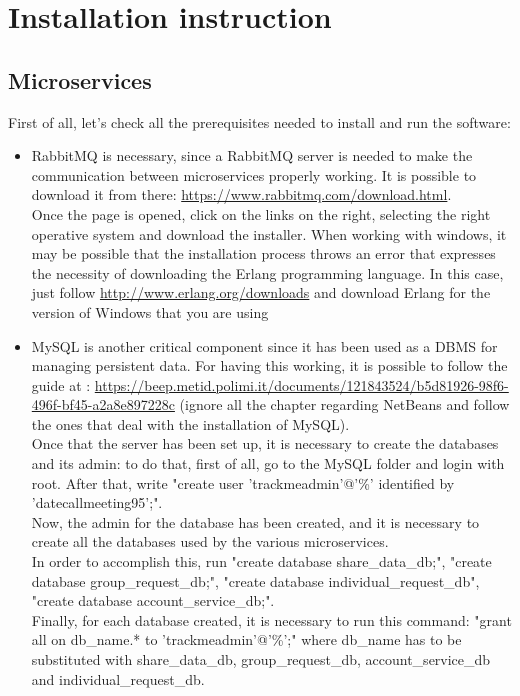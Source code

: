 \section{Installation instruction}
\subsection{Microservices}
First of all, let's check all the prerequisites needed to install and run the software:

\begin{itemize}

\item RabbitMQ is necessary, since a RabbitMQ server is needed to make the communication between microservices properly working.
It is possible to download it from there: \url{https://www.rabbitmq.com/download.html}. \\
Once the page is opened, click on the links on the right, selecting the right operative system and download the installer. 
When working with windows, it may be possible that the installation process throws an error that expresses the necessity of downloading
the Erlang programming language. In this case, just follow \url{http://www.erlang.org/downloads} and download Erlang for the version
of Windows that you are using

\item MySQL is another critical component since it has been used as a DBMS for managing persistent data. For having this working, it
is possible to follow the guide at : \url{https://beep.metid.polimi.it/documents/121843524/b5d81926-98f6-496f-bf45-a2a8e897228c} 
(ignore all the chapter regarding NetBeans and follow the ones that deal with the installation of MySQL). \\
Once that the server has been set up, it is necessary to create the databases and its admin: to do that, first of all, go to the MySQL 
folder and login with root. After that, write "create user 'trackmeadmin'@'\%' identified by 'datecallmeeting95';". \\
Now, the admin for the database has been created, and it is necessary to create all the databases used by the various microservices. \\
In order to accomplish this, run "create database share\_data\_db;", "create database group\_request\_db;", 
"create database individual\_request\_db", "create database account\_service\_db;". \\
Finally, for each database created, it is necessary to run this command: "grant all on db\_name.* to 'trackmeadmin'@'\%';"
where db\_name has to be substituted with share\_data\_db, group\_request\_db, account\_service\_db and individual\_request\_db. 

\end{itemize}

